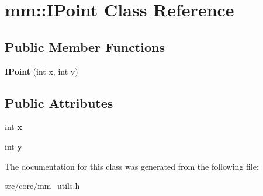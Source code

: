 \hypertarget{classmm_1_1_i_point}{}\section{mm\+:\+:I\+Point Class Reference}
\label{classmm_1_1_i_point}
\subsection*{Public Member Functions}
\begin{DoxyCompactItemize}
\item 
\hypertarget{classmm_1_1_i_point_ac62d2faccc100d72d4b93855d389c3bf}{}{\bfseries I\+Point} (int x, int y)\label{classmm_1_1_i_point_ac62d2faccc100d72d4b93855d389c3bf}

\end{DoxyCompactItemize}
\subsection*{Public Attributes}
\begin{DoxyCompactItemize}
\item 
\hypertarget{classmm_1_1_i_point_a27a375fbf08279125fa729f0337f30cb}{}int {\bfseries x}\label{classmm_1_1_i_point_a27a375fbf08279125fa729f0337f30cb}

\item 
\hypertarget{classmm_1_1_i_point_a9bb6a4bf0eaf73154558dcd379a2e9b1}{}int {\bfseries y}\label{classmm_1_1_i_point_a9bb6a4bf0eaf73154558dcd379a2e9b1}

\end{DoxyCompactItemize}


The documentation for this class was generated from the following file\+:\begin{DoxyCompactItemize}
\item 
src/core/mm\+\_\+utils.\+h\end{DoxyCompactItemize}
